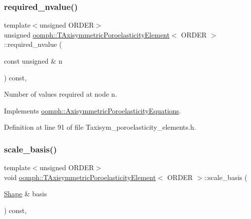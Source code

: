 \subsubsection{\texorpdfstring{required\+\_\+nvalue()}{required\_nvalue()}}
{\footnotesize\ttfamily template$<$unsigned O\+R\+D\+ER$>$ \\
unsigned \hyperlink{classoomph_1_1TAxisymmetricPoroelasticityElement}{oomph\+::\+T\+Axisymmetric\+Poroelasticity\+Element}$<$ O\+R\+D\+ER $>$\+::required\+\_\+nvalue (\begin{DoxyParamCaption}\item[{const unsigned \&}]{n }\end{DoxyParamCaption}) const\hspace{0.3cm}{\ttfamily [inline]}, {\ttfamily [virtual]}}



Number of values required at node n. 



Implements \hyperlink{classoomph_1_1AxisymmetricPoroelasticityEquations_a926fed18368bf5e4f4f52c6817c007b5}{oomph\+::\+Axisymmetric\+Poroelasticity\+Equations}.



Definition at line 91 of file Taxisym\+\_\+poroelasticity\+\_\+elements.\+h.

\mbox{\label{classoomph_1_1TAxisymmetricPoroelasticityElement_ad06425b96b50c62a9e006ca7877cbb95}} 
\subsubsection{\texorpdfstring{scale\+\_\+basis()}{scale\_basis()}}
{\footnotesize\ttfamily template$<$unsigned O\+R\+D\+ER$>$ \\
void \hyperlink{classoomph_1_1TAxisymmetricPoroelasticityElement}{oomph\+::\+T\+Axisymmetric\+Poroelasticity\+Element}$<$ O\+R\+D\+ER $>$\+::scale\+\_\+basis (\begin{DoxyParamCaption}\item[{\hyperlink{classoomph_1_1Shape}{Shape} \&}]{basis }\end{DoxyParamCaption}) const\hspace{0.3cm}{\ttfamily [inline]}, {\ttfamily [virtual]}}



